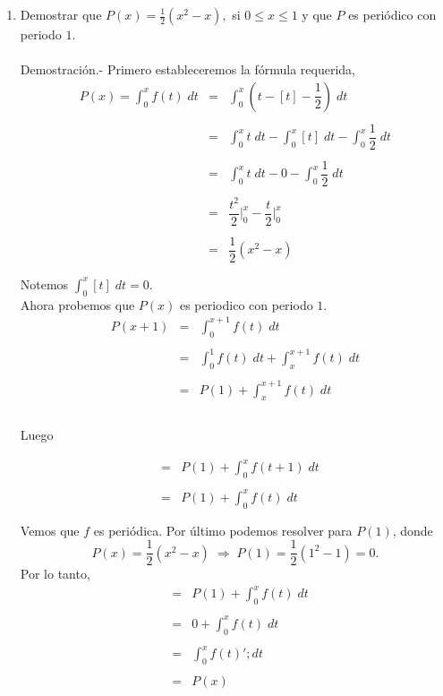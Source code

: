 \begin{enumerate}[\bfseries  1.]
\begin{enumerate}[\bfseries (a)]
	    \item Demostrar que $P(x)=\frac{1}{2}(x^2-x),$ si $0\leq x \leq 1$ y que $P$ es periódico con periodo $1$.\\\\
		Demostración.-\; Primero estableceremos la fórmula requerida,
		$$\begin{array}{rcl}
		    P(x)=\displaystyle\int_0^x f(t)\; dt&=&\displaystyle\int_0^x \left(t-[t]-\dfrac{1}{2}\right)\; dt\\\\
							&=&\displaystyle\int_0^x t\; dt - \int_0^x[t]\; dt - \int_0^x \dfrac{1}{2}\; dt\\\\
							&=&\displaystyle\int_0^x t\; dt - 0 - \displaystyle\int_0^x\dfrac{1}{2}\; dt\\\\
							&=&\dfrac{t^2}{2}\bigg|_0^x - \dfrac{t}{2}\bigg|_0^x\\\\
							&=&\dfrac{1}{2}(x^2-x)\\\\
		\end{array}$$
		Notemos $\displaystyle\int_0^x[t]\; dt = 0$.\\
		Ahora probemos que $P(x)$ es periodico con periodo $1$.
		$$\begin{array}{rcl}
		    P(x+1)&=&\displaystyle\int_0^{x+1}f(t)\; dt\\\\
			  &=&\displaystyle\int_0^1 f(t)\; dt + \int_x^{x+1} f(t)\; dt\\\\
			  &=&P(1)+\displaystyle\int_x^{x+1} f(t)\; dt\\\\
		\end{array}$$

		Luego

		$$\begin{array}{rcl}
		    &=&P(1)+\displaystyle\int_0^x f(t+1)\; dt\\\\
		    &=&P(1)+\displaystyle\int_0^x f(t)\; dt\\\\
		\end{array}$$
		Vemos que $f$ es periódica. Por último podemos resolver para $P(1)$, donde 
		$$P(x)=\dfrac{1}{2}(x^2-x)\; \Longrightarrow\; P(1)=\dfrac{1}{2}(1^2-1)=0.$$
		Por lo tanto,
		$$\begin{array}{rcl}
		    &=&P(1)+\displaystyle\int_0^x f(t)\; dt\\\\
		    &=&0+\displaystyle\int_0^x f(t)\; dt\\\\
		    &=&\displaystyle\int_0^x f(t)'; dt\\\\
		    &=&P(x)\\\\
		\end{array}$$


\end{enumerate}
\end{enumerate}
